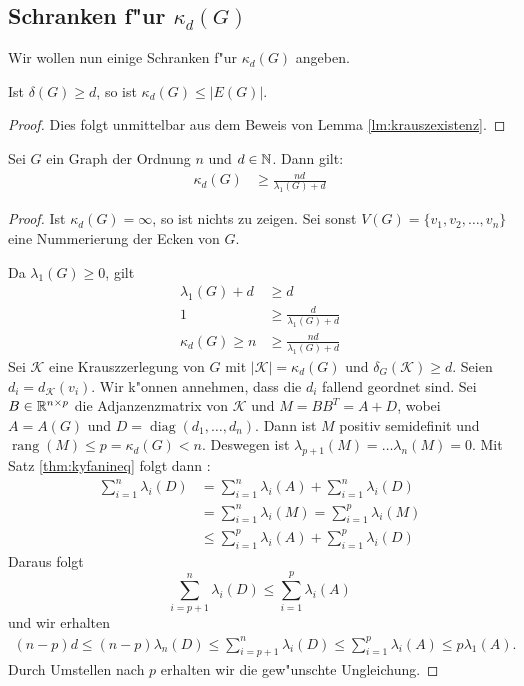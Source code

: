 \subsection{Schranken f"ur $\kappa_d(G)$}

Wir wollen nun einige Schranken f"ur $\kappa_{d}(G)$ angeben. 
\begin{lemma}
  Ist $\delta(G) \geq d$, so ist $\kappa_{d}(G) \leq |E(G)|$. 
\end{lemma}
\begin{proof}
  Dies folgt unmittelbar aus dem Beweis von Lemma \ref{lm:krauszexistenz}. 
\end{proof}

\begin{theorem}
  Sei $G$ ein Graph der Ordnung $n$ und $d\in {\mathbb{N}}$. Dann gilt:
  \begin{align*}
    \kappa_{d}(G) &\geq \frac{nd}{\lambda_{1}(G) +d} 
  \end{align*}
  \label{thm:kappaineq1}
\end{theorem}

\begin{proof}
  Ist $\kappa_{d}(G) = \infty$, so ist nichts zu zeigen. Sei sonst $V(G) = \{v_1,v_2,\dots, v_n\}$ eine Nummerierung der Ecken von $G$.

   Da $\lambda_{1}(G) \geq 0$, gilt 
  \begin{align*}
    \lambda_{1}(G) + d &\geq d \\
    1 &\geq \frac{d}{\lambda_{1}(G) + d }\\
    \kappa_{d}(G) \geq n &\geq \frac{nd}{\lambda_{1}(G)+d}
  \end{align*}
  Sei $\mathcal{K}$ eine Krauszzerlegung von $G$ mit $|\mathcal{K}| = \kappa_{d}(G)$ und $\delta_{G}(\mathcal{K}) \geq d$. Seien $d_{i} = d_{\mathcal{K}}(v_i)$. Wir k"onnen annehmen, dass die $d_{i}$ fallend geordnet sind. Sei $B\in {\mathbb{R}}^{n\times p}$ die Adjanzenzmatrix von $\mathcal{K}$ und $M = BB^{T} = A+D$, wobei $A= A(G)$ und $D = \operatorname{diag}(d_{1},\dots,d_n)$.
  Dann ist $M$ positiv semidefinit und $\operatorname{rang} (M) \leq p = \kappa_{d}(G) < n $. Deswegen ist $\lambda_{p+1}(M) = \dots \lambda_{n}(M) = 0$. 
  Mit Satz \ref{thm:kyfanineq} folgt dann : 
  \begin{align*}
    \sum\limits_{i=1}^{n} \lambda_{i}(D) &=\sum\limits_{i=1}^{n} \lambda_{i}(A) +\sum\limits_{i=1}^{n}  \lambda_{i}(D) \\
    &=\sum\limits_{i=1}^{n} \lambda_{i}(M) =\sum\limits_{i=1}^{p} \lambda_{i}(M) \\
    &\leq \sum\limits_{i=1}^{p} \lambda_{i}(A) +\sum\limits_{i=1}^{p} \lambda_{i}(D)
  \end{align*}
  Daraus folgt 
  $$\sum\limits_{i=p+1}^{n} \lambda_{i}(D) \leq\sum\limits_{i=1}^{p} \lambda_{i}(A)$$ und wir erhalten
  \begin{align*}
    (n-p) d \leq (n-p) \lambda_n(D) \leq \sum\limits_{i=p+1}^{n} \lambda_{i}(D) \leq\sum\limits_{i=1}^{p} \lambda_{i}(A) \leq p\lambda_{1}(A).
  \end{align*}
  Durch Umstellen nach $p$ erhalten wir die gew"unschte Ungleichung.
\end{proof}

